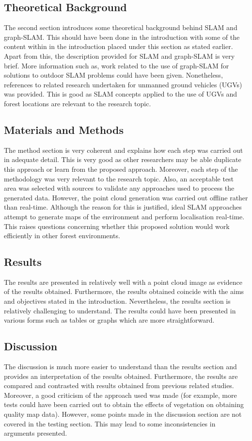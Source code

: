 \documentclass[a4paper, 12pt]{article}
\begin{document}
\subsection{Theoretical Background}
The second section introduces some theoretical background behind SLAM and graph-SLAM. This should have been done in the introduction with some of the content within in the introduction placed under this section as stated earlier. Apart from this, the description provided for SLAM and graph-SLAM is very brief. More information such as, work related to the use of graph-SLAM for solutions to outdoor SLAM problems could have been given. Nonetheless, references to related research undertaken for unmanned ground vehicles (UGVs) was provided. This is good as SLAM concepts applied to the use of UGVs and forest locations are relevant to the research topic.

\subsection{Materials and Methods}
The method section is very coherent and explains how each step was carried out in adequate detail. This is very good as other researchers may be able duplicate this approach or learn from the proposed approach. Moreover, each step of the methodology was very relevant to the research topic. Also, an acceptable test area was selected with sources to validate any approaches used to process the generated data. However, the point cloud generation was carried out offline rather than real-time. Although the reason for this is justified, ideal SLAM approaches attempt to generate maps of the environment and perform localisation real-time. This raises questions concerning whether this proposed solution would work efficiently in other forest environments. 

\subsection{Results}
The results are presented in relatively well with a point cloud image as evidence of the results obtained. Furthermore, the results obtained coincide with the aims and objectives stated in the introduction. Nevertheless, the results section is relatively challenging to understand. The results could have been presented in various forms such as tables or graphs which are more straightforward.

\subsection{Discussion}
The discussion is much more easier to understand than the results section and provides an interpretation of the results obtained. Furthermore, the results are compared and contrasted with results obtained from previous related studies. Moreover, a good criticism of the approach used was made (for example,  more tests could have been carried out to obtain the effects of vegetation on obtaining quality map data). However, some points made in the discussion section are not covered in the testing section. This may lead to some inconsistencies in arguments presented. 
\end{document}
